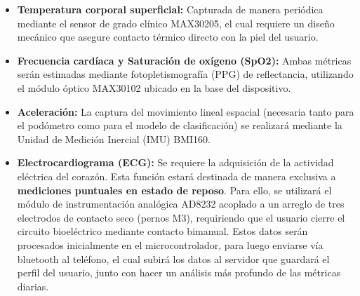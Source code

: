 \documentclass[letterpaper,11pt]{article}
\begin{document}
\begin{itemize}
    \item \textbf{Temperatura corporal superficial:} Capturada de manera periódica mediante el sensor de grado clínico MAX30205, el cual requiere un diseño mecánico que asegure contacto térmico directo con la piel del usuario.
    \item \textbf{Frecuencia cardíaca y Saturación de oxígeno (SpO2):} Ambas métricas serán estimadas mediante fotopletismografía (PPG) de reflectancia, utilizando el módulo óptico MAX30102 ubicado en la base del dispositivo.
    \item \textbf{Aceleración:} La captura del movimiento lineal espacial (necesaria tanto para el podómetro como para el modelo de clasificación) se realizará mediante la Unidad de Medición Inercial (IMU) BMI160.
    \item \textbf{Electrocardiograma (ECG):} Se requiere la adquisición de la actividad eléctrica del corazón. Esta función estará destinada de manera exclusiva a \textbf{mediciones puntuales en estado de reposo}. Para ello, se utilizará el módulo de instrumentación analógica AD8232 acoplado a un arreglo de tres electrodos de contacto seco (pernos M3), requiriendo que el usuario cierre el circuito bioeléctrico mediante contacto bimanual. Estos datos serán procesados inicialmente en el microcontrolador, para luego enviarse vía bluetooth al teléfono, el cual subirá los datos al servidor que guardará el perfil del usuario, junto con hacer un análisis más profundo de las métricas diarias.
\end{itemize}
\end{document}
